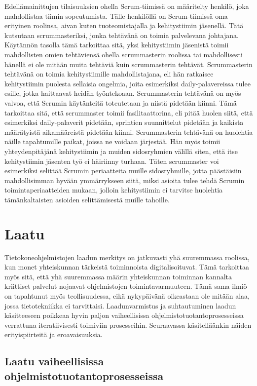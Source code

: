 \documentclass[finnish,nonumbib,nocopyright]{gradu2}
\begin{document}
Edellämainittujen tilaisuuksien ohella Scrum-tiimissä on määritelty henkilö, joka mahdollistaa tiimin sopeutumista. Tälle henkilöllä on Scrum-tiimissä oma erityinen roolinsa, aivan kuten tuoteomistajalla ja kehitystiimin jäsenellä. Tätä kutsutaan scrummasteriksi, jonka tehtävänä on toimia palvelevana johtajana. Käytännön tasolla tämä tarkoittaa sitä, yksi kehitystiimin jäsenistä toimii mahdollisten omien tehtäviensä ohella scrummasterin roolissa tai mahdollisesti hänellä ei ole mitään muita tehtäviä kuin scrummasterin tehtävät. Scrummasterin tehtävänä on toimia kehitystiimille mahdollistajana, eli hän ratkaisee kehitystiimin puolesta sellaisia ongelmia, joita esimerkiksi daily-palavereissa tulee esille, jotka haittaavat heidän työntekoaan. Scrummasterin tehtävänä on myös valvoa, että Scrumin käytänteitä toteutetaan ja niistä pidetään kiinni. Tämä tarkoittaa sitä, että scrummaster toimii fasilitaattorina, eli pitää huolen siitä, että esimerkiksi daily-palaverit pidetään, sprintien suunnittelut pidetään ja kaikista määrätyistä aikamääreistä pidetään kiinni. Scrummasterin tehtävänä on huolehtia näille tapahtumille paikat, joissa ne voidaan järjestää. Hän myös toimii yhteydenpitäjänä kehitystiimin ja muiden sidosryhmien välillä siten, että itse kehitystiimin jäsenten työ ei häiriinny turhaan. Täten scrummaster voi esimerkiksi selittää Scrumin periaatteita muille sidosryhmille, jotta päästäisiin mahdollisimman hyvään ymmärrykseen siitä, miksi asioita tulee tehdä Scrumin toimintaperiaatteiden mukaan, jolloin kehitystiimin ei tarvitse huolehtia tämänkaltaisten asioiden selittämisestä muille tahoille.

\section{Laatu}

Tietokoneohjelmistojen laadun merkitys on jatkuvasti yhä suuremmassa roolissa, kun monet yhteiskunnan tärkeistä toiminnoista digitalisoituvat. Tämä tarkoittaa myös sitä, että yhä suuremmassa määrin yhteiskunnan toiminnan kannalta kriittiset palvelut nojaavat ohjelmistojen toimintavarmuuteen. Tämä sama ilmiö on tapahtunut myös teollisuudessa, eikä nykypäivänä oikeastaan ole mitään alaa, jossa tietotekniikka ei tarvittaisi. Laadunvarmistus ja suhtautuminen laadun käsitteeseen poikkeaa hyvin paljon vaiheellisissa ohjelmistotuotantoprosesseissa verrattuna iteratiivisesti toimiviin prosesseihin. Seuraavassa käsitelläänkin näiden erityispiirteitä ja eroavaisuuksia.

\subsection{Laatu vaiheellisissa ohjelmistotuotantoprosesseissa}
\end{document}
